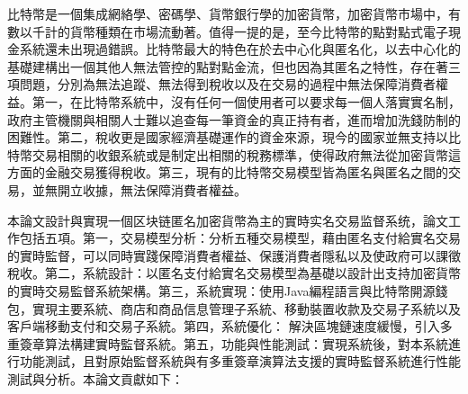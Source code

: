 
\begin{cabstract}

	比特幣是一個集成網絡學、密碼學、貨幣銀行學的加密貨幣，加密貨幣市場中，有數以千計的貨幣種類在市場流動著。值得一提的是，至今比特幣的點對點式電子現金系統還未出現過錯誤。比特幣最大的特色在於去中心化與匿名化，以去中心化的基礎建構出一個其他人無法管控的點對點金流，但也因為其匿名之特性，存在著三項問題，分別為無法追蹤、無法得到稅收以及在交易的過程中無法保障消費者權益。第一，在比特幣系統中，沒有任何一個使用者可以要求每一個人落實實名制，政府主管機關與相關人士難以追查每⼀筆資金的真正持有者，進而增加洗錢防制的困難性。第二，稅收更是國家經濟基礎運作的資金來源，現今的國家並無支持以比特幣交易相關的收銀系統或是制定出相關的稅務標準，使得政府無法從加密貨幣這方面的金融交易獲得稅收。第三，現有的比特幣交易模型皆為匿名與匿名之間的交易，並無開立收據，無法保障消費者權益。

	本論文設計與實現一個区块链匿名加密貨幣為主的實時实名交易监督系统，論文工作包括五項。第一，交易模型分析：分析五種交易模型，藉由匿名支付給實名交易的實時監督，可以同時實踐保障消費者權益、保護消費者隱私以及使政府可以課徵稅收。第二，系統設計：以匿名支付給實名交易模型為基礎以設計出支持加密貨幣的實時交易監督系統架構。第三，系統實現：使用Java編程語言與比特幣開源錢包，實現主要系統、商店和商品信息管理子系統、移動裝置收款及交易子系統以及客戶端移動支付和交易子系統。第四，系統優化：
	解決區塊鏈速度緩慢，引入多重簽章算法構建實時監督系統。第五，功能與性能測試：實現系統後，對本系統進行功能測試，且對原始監督系統與有多重簽章演算法支援的實時監督系統進行性能測試與分析。本論文貢獻如下：



\end{cabstract}

